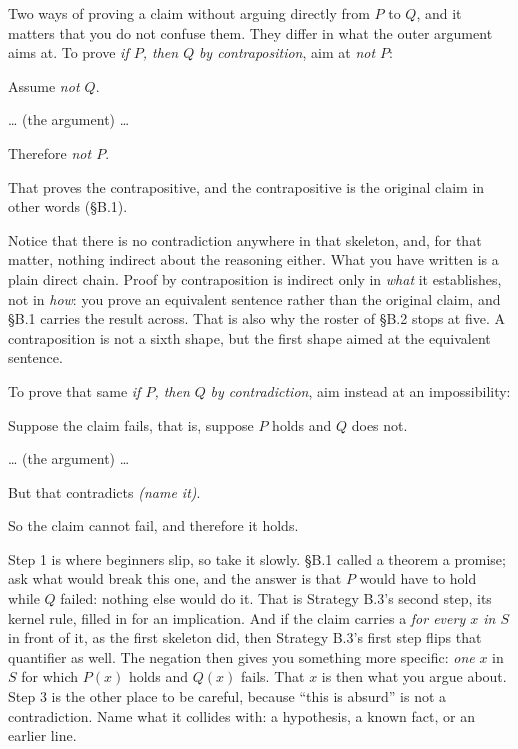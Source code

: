 \documentclass[a4paper,12pt,oneside]{memoir}
\begin{document}
 Two ways of proving a claim without arguing directly from \(P\) to \(Q\), and it matters that you do not confuse them. They differ in what the outer argument aims at. To prove \emph{if \(P\), then \(Q\)} \emph{by contraposition}, aim at \emph{not \(P\)}:

\begin{steps}
  \item Assume \emph{not \(Q\)}.
  \item … (the argument) …
  \item Therefore \emph{not \(P\)}.
  \item That proves the contrapositive, and the contrapositive is the original claim in other words (§B.1).
\end{steps}
Notice that there is no contradiction anywhere in that skeleton, and, for that matter, nothing indirect about the reasoning either. What you have written is a plain direct chain. Proof by contraposition is indirect only in \emph{what} it establishes, not in \emph{how}: you prove an equivalent sentence rather than the original claim, and §B.1 carries the result across. That is also why the roster of §B.2 stops at five. A contraposition is not a sixth shape, but the first shape aimed at the equivalent sentence.

To prove that same \emph{if \(P\), then \(Q\)} \emph{by contradiction}, aim instead at an impossibility:

\begin{steps}
  \item Suppose the claim fails, that is, suppose \(P\) holds and \(Q\) does not.
  \item … (the argument) …
  \item But that contradicts \emph{(name it)}.
  \item So the claim cannot fail, and therefore it holds.
\end{steps}
Step 1 is where beginners slip, so take it slowly. §B.1 called a theorem a promise; ask what would break this one, and the answer is that \(P\) would have to hold while \(Q\) failed: nothing else would do it. That is Strategy B.3’s second step, its kernel rule, filled in for an implication. And if the claim carries a \emph{for every \(x\) in \(S\)} in front of it, as the first skeleton did, then Strategy B.3’s first step flips that quantifier as well. The negation then gives you something more specific: \emph{one} \(x\) in \(S\) for which \(P(x)\) holds and \(Q(x)\) fails. That \(x\) is then what you argue about. Step 3 is the other place to be careful, because “this is absurd” is not a contradiction. Name what it collides with: a hypothesis, a known fact, or an earlier line.
\end{document}
